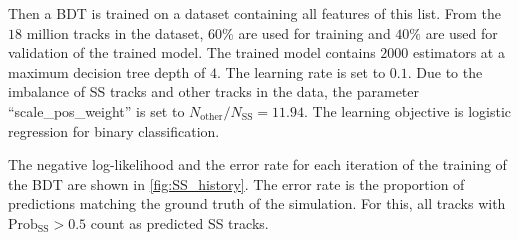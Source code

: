 Then a BDT is trained on a dataset containing all features of this list.
From the $18$ million tracks in the dataset, $60\%$ are used for training and $40\%$ are used for validation of the trained model.
The trained model contains $2000$ estimators at a maximum decision tree depth of $4$.
The learning rate is set to $0.1$.
Due to the imbalance of SS tracks and other tracks in the data, the parameter \enquote{scale\_pos\_weight} is set to $N_\text{other}/N_\text{SS} = 11.94$.
The learning objective is logistic regression for binary classification.

The negative log-likelihood and the error rate for each iteration of the training of the BDT are shown in \autoref{fig:SS_history}.
The error rate is the proportion of predictions matching the ground truth of the simulation.
For this, all tracks with $\text{Prob}_\text{SS}>0.5$ count as predicted SS tracks. 

